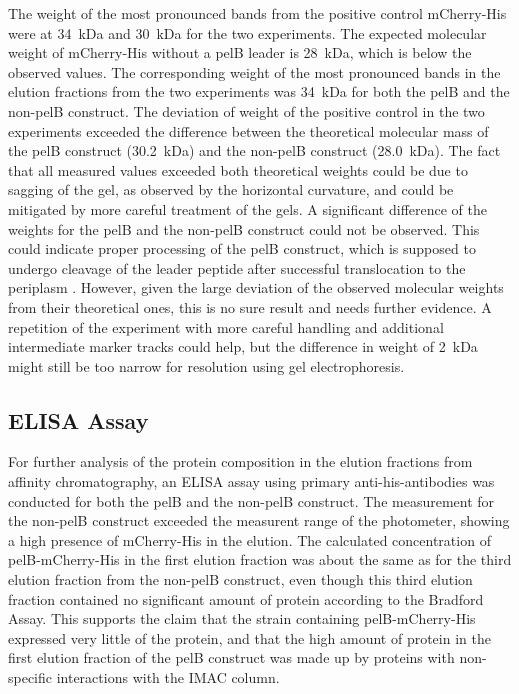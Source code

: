 \documentclass[a4paper,12pt]{article}
\begin{document}
The weight of the most pronounced bands from the positive control mCherry-His were at 34~kDa and 30~kDa for the two experiments. The expected molecular weight of mCherry-His without a pelB leader is 28~kDa, which is below the observed values. The corresponding weight of the most pronounced bands in the elution fractions from the two experiments was 34~kDa for both the pelB and the non-pelB construct. The deviation of weight of the positive control in the two experiments exceeded the difference between the theoretical molecular mass of the pelB construct (30.2~kDa) and the non-pelB construct (28.0~kDa). The fact that all measured values exceeded both theoretical weights could be due to sagging of the gel, as observed by the horizontal curvature, and could be mitigated by more careful treatment of the gels. A significant difference of the weights for the pelB and the non-pelB construct could not be observed. This could indicate proper processing of the pelB construct, which is supposed to undergo cleavage of the leader peptide after successful translocation to the periplasm \cite{Sockolosky2013}. However, given the large deviation of the observed molecular weights from their theoretical ones, this is no sure result and needs further evidence. A repetition of the experiment with more careful handling and additional intermediate marker tracks could help, but the difference in weight of 2~kDa might still be too narrow for resolution using gel electrophoresis.


\subsection{ELISA Assay}
For further analysis of the protein composition in the elution fractions from affinity chromatography, an ELISA assay using primary anti-his-antibodies was conducted for both the pelB and the non-pelB construct. The measurement for the non-pelB construct exceeded the measurent range of the photometer, showing a high presence of mCherry-His in the elution. The calculated concentration of pelB-mCherry-His in the first elution fraction was about the same as for the third elution fraction from the non-pelB construct, even though this third elution fraction contained no significant amount of protein according to the Bradford Assay. This supports the claim that the strain containing pelB-mCherry-His expressed very little of the protein, and that the high amount of protein in the first elution fraction of the pelB construct was made up by proteins with non-specific interactions with the IMAC column. 
\end{document}
